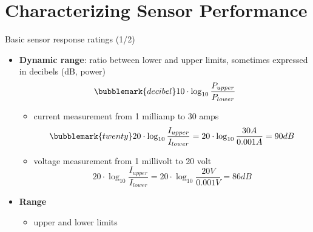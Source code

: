 \documentclass[compress]{beamer}
\begin{document}
\section[Characterizing Performance]{Characterizing Sensor Performance}\label{characterizing-sensor-performance}

\begin{frame}{Basic sensor response ratings (1/2)}

\begin{itemize}
    \item {\bf Dynamic range}: ratio between lower and upper limits, sometimes expressed
    in decibels (dB, power)
\[
\bubblemark{decibel}10\cdot \log_{10}\frac{P_{upper}}{P_{lower}}
\]


        \begin{itemize}
        
        \item<3->
        \eg current measurement from 1 milliamp to 30 amps
        \[
            \bubblemark{twenty}20\cdot\log_{10}\frac{I_{upper}}{I_{lower}}=20\cdot\log_{10}\frac{30A}{0.001A}=90dB
        \]

        \item<4->
        \eg voltage measurement from 1 millivolt to 20 volt
        \[
            20\cdot\log_{10}\frac{I_{upper}}{I_{lower}}=20\cdot\log_{10}\frac{20V}{0.001V}=86dB
        \]
        \end{itemize}

    \item<5-> {\bf Range}
        \begin{itemize}
        
        \item upper and lower limits
        \end{itemize}



\end{itemize}

\end{frame}

\end{document}
